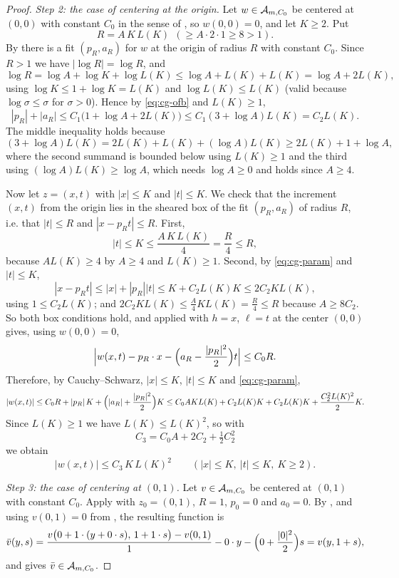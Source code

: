 \begin{proof}
\emph{Step 2: the case of centering at the origin.}
Let $w\in\mathcal{A}_{m,C_0}$ be centered at $(0,0)$ with constant $C_0$ in the
sense of , so $w(0,0)=0$, and let $K\ge2$. Put
\[
  R=A\,K\,L(K)\ \ (\ge A\cdot2\cdot1\ge8>1).
\]
By  there is a fit $(p_R,a_R)$ for $w$ at the origin of
radius $R$ with constant $C_0$. Since $R>1$ we have $|\log R|=\log R$, and
\[
  \log R=\log A+\log K+\log L(K)\le\log A+L(K)+L(K)=\log A+2L(K),
\]
using $\log K\le1+\log K=L(K)$ and $\log L(K)\le L(K)$ (valid because
$\log\sigma\le\sigma$ for $\sigma>0$). Hence by \eqref{eq:cg-ofb} and
$L(K)\ge1$,
\begin{equation}\label{eq:cg-param}
  |p_R|+|a_R|\le C_1\bigl(1+\log A+2L(K)\bigr)
   \le C_1(3+\log A)L(K)=C_2L(K).
\end{equation}
The middle inequality holds because
\[
  (3+\log A)L(K)=2L(K)+L(K)+(\log A)L(K)
   \ge2L(K)+1+\log A ,
\]
where the second summand is bounded below using $L(K)\ge1$ and the third using
$(\log A)L(K)\ge\log A$, which needs $\log A\ge0$ and holds since $A\ge4$.

Now let $z=(x,t)$ with $|x|\le K$ and $|t|\le K$. We check that the increment
$(x,t)$ from the origin lies in the sheared box of the fit $(p_R,a_R)$ of radius
$R$, i.e. that $|t|\le R$ and $|x-p_Rt|\le R$. First,
\[
  |t|\le K\le\frac{A\,K\,L(K)}{4}=\frac R4\le R,
\]
because $AL(K)\ge4$ by $A\ge4$ and $L(K)\ge1$. Second, by
\eqref{eq:cg-param} and $|t|\le K$,
\[
  |x-p_Rt|\le|x|+|p_R||t|\le K+C_2L(K)K\le2C_2KL(K),
\]
using $1\le C_2L(K)$; and $2C_2KL(K)\le\frac{A}{4}KL(K)=\frac R4\le R$ because
$A\ge8C_2$. So both box conditions hold, and  applied with
$h=x$, $\ell=t$ at the center $(0,0)$ gives, using $w(0,0)=0$,
\[
  \Bigl|w(x,t)-p_R\cdot x-\Bigl(a_R-\frac{|p_R|^2}{2}\Bigr)t\Bigr|\le C_0R .
\]
Therefore, by Cauchy--Schwarz, $|x|\le K$, $|t|\le K$ and
\eqref{eq:cg-param},
\[
  |w(x,t)|\le C_0R+|p_R|\,K+\Bigl(|a_R|+\frac{|p_R|^2}{2}\Bigr)K
   \le C_0AKL(K)+C_2L(K)K+C_2L(K)K+\frac{C_2^2L(K)^2}{2}K .
\]
Since $L(K)\ge1$ we have $L(K)\le L(K)^2$, so with
\[
  C_3=C_0A+2C_2+\tfrac12C_2^2
\]
we obtain
\begin{equation}\label{eq:cg-origin}
  |w(x,t)|\le C_3\,K\,L(K)^2\qquad(|x|\le K,\ |t|\le K,\ K\ge2).
\end{equation}

\emph{Step 3: the case of centering at $(0,1)$.}
Let $v\in\mathcal{A}_{m,C_0}$ be centered at $(0,1)$ with constant $C_0$. Apply
 with $z_0=(0,1)$, $R=1$, $p_0=0$ and $a_0=0$. By
, and using $v(0,1)=0$ from , the
resulting function is
\[
  \bar v(y,s)=\frac{v\bigl(0+1\cdot(y+0\cdot s),\,1+1\cdot s\bigr)-v(0,1)}{1}
     -0\cdot y-\Bigl(0+\frac{|0|^2}{2}\Bigr)s=v(y,1+s),
\]
and  gives $\bar v\in\mathcal{A}_{m,C_0}$.


\end{proof}
